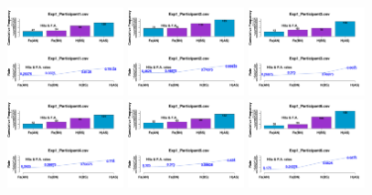 \begin{figure}[th]
\centering
\includegraphics[width=0.30\textwidth]{Figures/MirrorRate_Exp1_P1} \includegraphics[width=0.30\textwidth]{Figures/MirrorRate_Exp1_P2} \includegraphics[width=0.30\textwidth]{Figures/MirrorRate_Exp1_P3}
\includegraphics[width=0.30\textwidth]{Figures/MirrorRate_Exp1_P4} \includegraphics[width=0.30\textwidth]{Figures/MirrorRate_Exp1_P5} \includegraphics[width=0.30\textwidth]{Figures/MirrorRate_Exp1_P6}

\end{figure}
